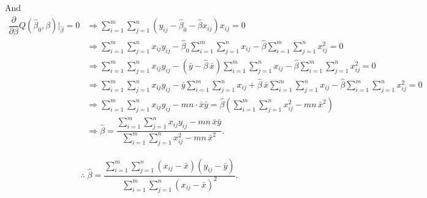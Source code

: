 \documentclass[11pt, a4paper]{article}
\begin{document}
And
\begin{align}
\dfrac{\partial}{\partial \beta} Q(\widehat{\beta}_0, \beta) \Bigg|_{\widehat{\beta}} = 0 
&\Rightarrow 
\sum \limits_{i=1}^{m} \sum \limits_{j=1}^{n}
\left(y_{ij} - \widehat{\beta}_0 - \widehat{\beta} x_{ij} \right) x_{ij} = 0 \nonumber \\[0.5em]
&\Rightarrow
\sum \limits_{i=1}^{m} \sum \limits_{j=1}^{n} x_{ij} y_{ij}
- \widehat{\beta}_0 \sum \limits_{i=1}^{m} \sum \limits_{j=1}^{n} x_{ij}
- \widehat{\beta} \sum \limits_{i=1}^{m} \sum \limits_{j=1}^{n} x_{ij}^2
= 0 \nonumber \\[0.5em]
&\Rightarrow
\sum \limits_{i=1}^{m} \sum \limits_{j=1}^{n} x_{ij} y_{ij}
- (\bar{y} - \widehat{\beta}\,\bar{x}) \sum \limits_{i=1}^{m} \sum \limits_{j=1}^{n} x_{ij}
- \widehat{\beta} \sum \limits_{i=1}^{m} \sum \limits_{j=1}^{n} x_{ij}^2
= 0 \nonumber \\[0.5em]
&\Rightarrow
\sum \limits_{i=1}^{m} \sum \limits_{j=1}^{n} x_{ij} y_{ij} - 
\bar{y} \sum \limits_{i=1}^{m} \sum \limits_{j=1}^{n} x_{ij} 
+ \widehat{\beta}\,\bar{x} \sum \limits_{i=1}^{m} \sum \limits_{j=1}^{n} x_{ij}
- \widehat{\beta} \sum \limits_{i=1}^{m} \sum \limits_{j=1}^{n} x_{ij}^2
= 0 \nonumber \\[0.5em]
&\Rightarrow
\sum \limits_{i=1}^{m} \sum \limits_{j=1}^{n} x_{ij} y_{ij} - 
mn \cdot \bar{x} \bar{y} = \widehat{\beta} \left(
\sum \limits_{i=1}^{m} \sum \limits_{j=1}^{n} x_{ij}^2
- mn\,\bar{x}^2
\right) \nonumber \\[0.5em]
&\Rightarrow
\widehat{\beta}
=
\dfrac{
\sum \limits_{i=1}^{m} \sum \limits_{j=1}^{n} x_{ij} y_{ij}
- mn\,\bar{x}\bar{y}
}{
\sum \limits_{i=1}^{m} \sum \limits_{j=1}^{n} x_{ij}^2
- mn\,\bar{x}^2
}.
\end{align}

\begin{align*}
\therefore \; \widehat{\beta}
=
\dfrac{
\sum \limits_{i=1}^{m} \sum \limits_{j=1}^{n}
(x_{ij} - \bar{x})(y_{ij} - \bar{y})
}{
\sum \limits_{i=1}^{m} \sum \limits_{j=1}^{n}
(x_{ij} - \bar{x})^2
}.
\end{align*}


\vspace{5em}

\begin{center}
\BlackRookOnBlack \BlackKnightOnWhite \BlackBishopOnBlack \BlackKingOnWhite \BlackQueenOnBlack \BlackBishopOnWhite \BlackKnightOnBlack \BlackRookOnWhite
\end{center}
\end{document}
